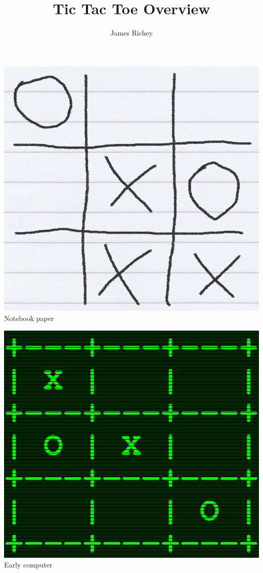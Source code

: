 \documentclass{tufte-handout}
\title{Tic Tac Toe Overview}
\author{James Richey}
\begin{document}
\maketitle


\begin{marginfigure}
  \includegraphics[width=\linewidth]{img/concept-art/paper}
  Notebook paper
\end{marginfigure}

\begin{marginfigure}
  \includegraphics[width=\linewidth]{img/concept-art/computer}
  Early computer
\end{marginfigure}
\end{document}
